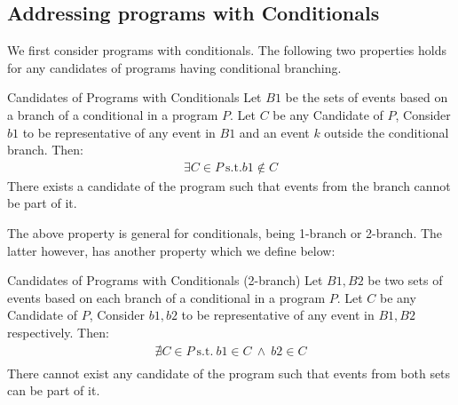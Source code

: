 \subsection{Addressing programs with Conditionals}

        We first consider programs with conditionals. 
        The following two properties holds for any candidates of programs having conditional branching. 
        \begin{property}{Candidates of Programs with Conditionals}
            \label{CondB1}
            Let $B1$ be the sets of events based on a branch of a conditional in a program $P$. Let $C$ be any Candidate of $P$, Consider $b1$ to be representative of any event in $B1$ and an event $k$ outside the conditional branch. Then:
            \begin{align*}
                \exists C \in P \ \text{s.t.} b1 \notin C  
            \end{align*}
            There exists a candidate of the program such that events from the branch cannot be part of it\footnotemark. 
        \end{property}

        The above property is general for conditionals, being 1-branch or 2-branch. 
        The latter however, has another property which we define below:
        \begin{property}{Candidates of Programs with Conditionals (2-branch)}
            \label{CondB2}
            Let $B1,B2$ be two sets of events based on each branch of a conditional in a program $P$. Let $C$ be any Candidate of $P$,  Consider $b1,b2$ to be representative of any event in $B1,B2$ respectively. Then:
            \begin{align*}
                \nexists C \in P \ \text{s.t.} \ b1 \in C \ \wedge \ b2 \in C \\ 
            \end{align*}
            There cannot exist any candidate of the program such that events from both sets can be part of it. 
        \end{property}

